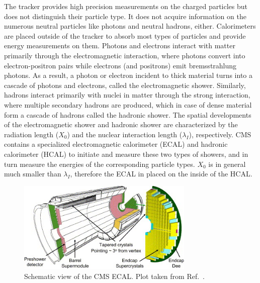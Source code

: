 The tracker provides high precision measurements on the charged particles but does not distinguish their particle type.
It does not acquire information on the numerous neutral particles like photons and neutral hadrons, either.
Calorimeters are placed outside of the tracker to absorb most types of particles and provide energy measurements on them.
Photons and electrons interact with matter primarily through the electromagnetic interaction, 
where photons convert into electron-positron pairs while electrons (and positrons) emit bremsstrahlung photons.
As a result, a photon or electron incident to thick material turns into a cascade of photons and electrons, called the electromagnetic shower.
Similarly, hadrons interact primarily with nuclei in matter through the strong interaction,
where multiple secondary hadrons are produced, which in case of dense material form a cascade of hadrons called the hadronic shower.
The spatial developments of the electromagnetic shower and hadronic shower are characterized by the radiation length ($X_{0}$) and the nuclear interaction length ($\lambda_{I}$), respectively.
CMS contains a specialized electromagnetic calorimeter (ECAL) and hadronic calorimeter (HCAL) to initiate and measure these two types of showers,
and in turn measure the energies of the corresponding particle types.
$X_{0}$ is in general much smaller than $\lambda_{I}$, therefore the ECAL in placed on the inside of the HCAL.

\begin{figure}[!htb]
    \centering
    \captionsetup{justification=centering}
    \includegraphics[width=0.75\textwidth]{pics/LHC_CMS/ECAL.jpg}
    \caption{Schematic view of the CMS ECAL.
             Plot taken from Ref.~\cite{BROWN200729}.}
    \label{fig:cms_ecal}
\end{figure}

